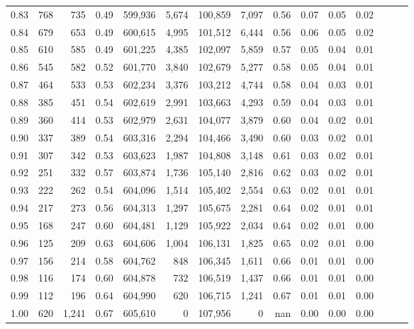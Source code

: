 \begin{tabular}{rrrrrrrrrrrrrrr}
0.83 &     768 &    735 &  0.49 &  599,936 &    5,674 &  100,859 &    7,097 &  0.56 &  0.07 &  0.05 &      0.02 \\
0.84 &     679 &    653 &  0.49 &  600,615 &    4,995 &  101,512 &    6,444 &  0.56 &  0.06 &  0.05 &      0.02 \\
0.85 &     610 &    585 &  0.49 &  601,225 &    4,385 &  102,097 &    5,859 &  0.57 &  0.05 &  0.04 &      0.01 \\
0.86 &     545 &    582 &  0.52 &  601,770 &    3,840 &  102,679 &    5,277 &  0.58 &  0.05 &  0.04 &      0.01 \\
0.87 &     464 &    533 &  0.53 &  602,234 &    3,376 &  103,212 &    4,744 &  0.58 &  0.04 &  0.03 &      0.01 \\
0.88 &     385 &    451 &  0.54 &  602,619 &    2,991 &  103,663 &    4,293 &  0.59 &  0.04 &  0.03 &      0.01 \\
0.89 &     360 &    414 &  0.53 &  602,979 &    2,631 &  104,077 &    3,879 &  0.60 &  0.04 &  0.02 &      0.01 \\
0.90 &     337 &    389 &  0.54 &  603,316 &    2,294 &  104,466 &    3,490 &  0.60 &  0.03 &  0.02 &      0.01 \\
0.91 &     307 &    342 &  0.53 &  603,623 &    1,987 &  104,808 &    3,148 &  0.61 &  0.03 &  0.02 &      0.01 \\
0.92 &     251 &    332 &  0.57 &  603,874 &    1,736 &  105,140 &    2,816 &  0.62 &  0.03 &  0.02 &      0.01 \\
0.93 &     222 &    262 &  0.54 &  604,096 &    1,514 &  105,402 &    2,554 &  0.63 &  0.02 &  0.01 &      0.01 \\
0.94 &     217 &    273 &  0.56 &  604,313 &    1,297 &  105,675 &    2,281 &  0.64 &  0.02 &  0.01 &      0.01 \\
0.95 &     168 &    247 &  0.60 &  604,481 &    1,129 &  105,922 &    2,034 &  0.64 &  0.02 &  0.01 &      0.00 \\
0.96 &     125 &    209 &  0.63 &  604,606 &    1,004 &  106,131 &    1,825 &  0.65 &  0.02 &  0.01 &      0.00 \\
0.97 &     156 &    214 &  0.58 &  604,762 &      848 &  106,345 &    1,611 &  0.66 &  0.01 &  0.01 &      0.00 \\
0.98 &     116 &    174 &  0.60 &  604,878 &      732 &  106,519 &    1,437 &  0.66 &  0.01 &  0.01 &      0.00 \\
0.99 &     112 &    196 &  0.64 &  604,990 &      620 &  106,715 &    1,241 &  0.67 &  0.01 &  0.01 &      0.00 \\
1.00 &     620 &  1,241 &  0.67 &  605,610 &        0 &  107,956 &        0 &   nan &  0.00 &  0.00 &      0.00 \\
\bottomrule
\end{tabular}
